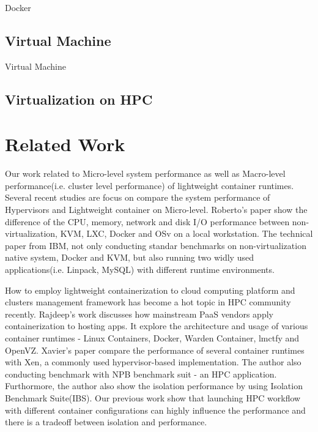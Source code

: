 \documentclass{article}
\begin{document}
Docker\cite{dockerwb}

\subsection{Virtual Machine}

Virtual Machine\cite{rosenblum2005virtual}

\subsection{Virtualization on HPC}

\section{Related Work}

Our work related to Micro-level system performance as well as Macro-level performance(i.e. cluster
level performance) of lightweight container runtimes. Several recent studies are focus on compare 
the system performance of Hypervisors and Lightweight container on Micro-level. Roberto's 
paper\cite{morabito2015hypervisors} show the difference of the CPU, memory, network and disk I/O 
performance between non-virtualization, KVM, LXC, Docker and OSv on a local workstation. The 
technical paper from IBM\cite{felter2014updated}, not only conducting standar benchmarks on 
non-virtualization native system, Docker and KVM, but also running two widly used 
applications(i.e. Linpack, MySQL) with different runtime environments.  

How to employ lightweight containerization to cloud computing platform and clusters management 
framework has become a hot topic in HPC community recently. Rajdeep's 
work\cite{dua2014virtualization} discusses how mainstream PaaS vendors apply containerization to 
hosting apps. It explore the architecture and usage of various container runtimes - Linux 
Containers, Docker, Warden Container, lmctfy and OpenVZ. Xavier's paper\cite{xavier2013performance}
compare the performance of several container runtimes with Xen, a commonly used hypervisor-based 
implementation. The author also conducting benchmark with NPB benchmark suit - an HPC application. 
Furthormore, the author also show the isolation performance by using Isolation Benchmark Suite(IBS).
Our previous work\cite{zheng2015integrating} show that launching HPC workflow with 
different container configurations can highly influence the performance and there is a 
tradeoff between isolation and performance. 
\end{document}
